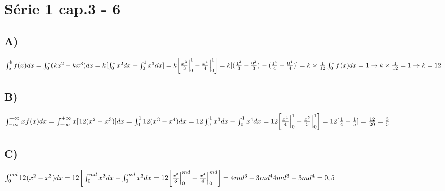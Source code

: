 \section*{Série 1 cap.3  - 6}
    
    \subsection*{A)}
    $\int_{a}^{b}f(x)dx = \int_{0}^{1}(kx^2 - kx^3)dx = k [\int_{0}^{1}x^2dx - \int_{0}^{1}x^3dx] = k \bigg[\frac{x^3}{3}\Big|^1_0 - \frac{x^4}{4}\Big|^1_0\bigg] = k [(\frac{1^3}{3} - \frac{0^3}{3}) - (\frac{1^4}{4} - \frac{0^4}{4})] = k \times \frac{1}{12}\\
    \int_{0}^{1}f(x)dx = 1 \rightarrow k \times \frac{1}{12} = 1 \rightarrow k = 12$
    
    \subsection*{B)}
    $\int_{-\infty}^{+\infty}xf(x)dx = \int_{-\infty}^{+\infty}x[12(x^2 - x^3)]dx = \int_{0}^{1}12(x^3 - x^4)dx = 12\int_{0}^{1}x^3dx - \int_{0}^{1}x^4dx = \\
    12 \bigg[\frac{x^4}{4}\Big|^1_0 - \frac{x^5}{5}\Big|^1_0\bigg] = 12 [\frac{1}{4} - \frac{1}{5}] = \frac{12}{20} = \frac{3}{5}$
    
    
    \subsection*{C)}
    $\int_{0}^{md}12(x^2 - x^3)dx = 12 \bigg[\int_{0}^{md}x^2dx - \int_{0}^{md}x^3dx = 12\bigg[\frac{x^3}{3}\Big|^{md}_0 - \frac{x^4}{4}\Big|^{md}_0\bigg] = 4md^3 - 3md^4\\
    4md^3 - 3md^4 = 0,5$ 
    
